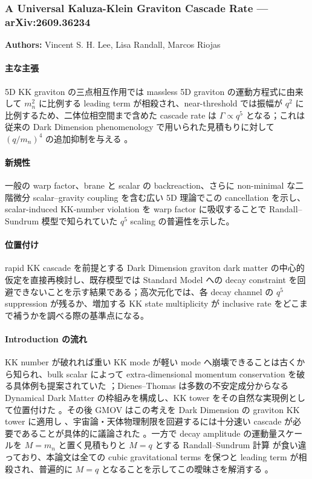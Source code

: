 \subsubsection{A Universal Kaluza-Klein Graviton Cascade Rate --- arXiv:2609.36234}

\textbf{Authors:} Vincent S. H. Lee, Lisa Randall, Marcos Riojas

\paragraph{主な主張}
5D KK graviton の三点相互作用では massless 5D graviton の運動方程式に由来して $m_n^2$ に比例する leading term が相殺され、near-threshold では振幅が $q^2$ に比例するため、二体位相空間まで含めた cascade rate は $\Gamma\propto q^5$ となる；これは従来の Dark Dimension phenomenology で用いられた見積もりに対して $(q/m_n)^4$ の追加抑制を与える \cite{Lee:2026KKCascade}。

\paragraph{新規性}
一般の warp factor、brane と scalar の backreaction、さらに non-minimal な二階微分 scalar--gravity coupling を含む広い 5D 理論でこの cancellation を示し、scalar-induced KK-number violation を warp factor に吸収することで Randall--Sundrum 模型で知られていた $q^5$ scaling の普遍性を示した。

\paragraph{位置付け}
rapid KK cascade を前提とする Dark Dimension graviton dark matter の中心的仮定を直接再検討し、既存模型では Standard Model への decay constraint を回避できないことを示す結果である；高次元化では、各 decay channel の $q^5$ suppression が残るか、増加する KK state multiplicity が inclusive rate をどこまで補うかを調べる際の基準点になる。

\paragraph{Introduction の流れ}
KK number が破れれば重い KK mode が軽い mode へ崩壊できることは古くから知られ、bulk scalar によって extra-dimensional momentum conservation を破る具体例も提案されていた \cite{Mohapatra:2003KKDecay}；Dienes--Thomas は多数の不安定成分からなる Dynamical Dark Matter の枠組みを構成し、KK tower をその自然な実現例として位置付けた \cite{Dienes:2011DDM1,Dienes:2011DDM2}。その後 GMOV はこの考えを Dark Dimension の graviton KK tower に適用し \cite{Gonzalo:2022DarkGravitons,Vafa:2024DarkSector}、宇宙論・天体物理制限を回避するには十分速い cascade が必要であることが具体的に議論された \cite{Obied:2023DecayingGravitons,LawSmith:2023AstroGravitons}。一方で decay amplitude の運動量スケールを $M=m_n$ と置く見積もりと $M=q$ とする Randall--Sundrum 計算 \cite{deGiorgi:2021Spin2} が食い違っており、本論文は全ての cubic gravitational terms を保つと leading term が相殺され、普遍的に $M=q$ となることを示してこの曖昧さを解消する \cite{Lee:2026KKCascade}。
